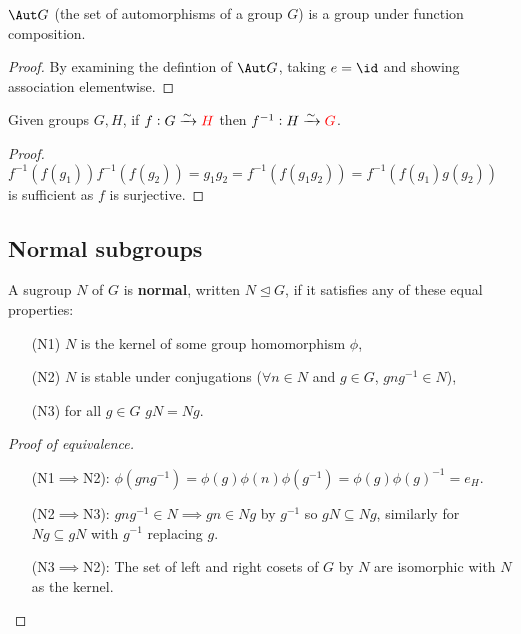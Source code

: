 \documentclass[../Year2.tex]{subfiles}
\begin{document}
\begin{theorem}
    $\Aut G$ (the set of automorphisms of a group $G$) is a group under function composition.
    \begin{proof}
        By examining the defintion of $\Aut G$, taking $e=\id$ and showing association elementwise.
    \end{proof}
\end{theorem}

\begin{theorem}
    Given groups $G,H$, if $f:G\xrightarrow{\sim}\textcolor{red}{H}$ then $f^{-1}:H\xrightarrow{\sim}\textcolor{red}{G}$. 
    \begin{proof}
        $f^{-1}(f(g_1))f^{-1}(f(g_2))=g_1g_2=f^{-1}(f(g_1g_2))=f^{-1}(f(g_1)g(g_2))$ is sufficient as $f$ is surjective.
    \end{proof}
\end{theorem}

\subsection{Normal subgroups}

\begin{definition}
    A sugroup $N$ of $G$ is \textbf{normal}, written $N\unlhd G$, if it satisfies any of these equal properties: \begin{enumerate}
        \item[(N1)] $N$ is the kernel of some group homomorphism $\phi$,
        \item[(N2)] $N$ is stable under conjugations ($\forall n\in N$ and $g\in G$, $gng^{-1}\in N$),
        \item[(N3)] for all $g\in G$ $gN=Ng$.
    \end{enumerate}
    \begin{proof}[Proof of equivalence]
        \begin{enumerate}
            \item[] (N1$\implies$N2): $\phi(gng^{-1}) = \phi(g)\phi(n)\phi(g^{-1})=\phi(g)\phi(g)^{-1}=e_H$.
            \item[] (N2$\implies$N3): $gng^{-1}\in N\implies gn\in Ng$ by $g^{-1}$ so $gN\subseteq Ng$, similarly for $Ng\subseteq gN$ with $g^{-1}$ replacing $g$.
            \item[] (N3$\implies$N2): The set of left and right cosets of $G$ by $N$ are isomorphic with $N$ as the kernel.
        \end{enumerate}
        \vspace{-12pt}
    \end{proof} 
\end{definition}
\vspace{-10pt}
\end{document}
